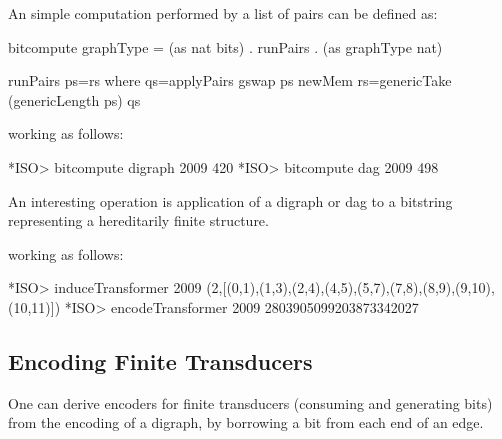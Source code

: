 \documentclass[]{INCLUDES/llncs}
\begin{document}
An simple computation performed by a list of
pairs can be defined as:
\begin{code}
bitcompute graphType =  (as nat bits) . runPairs . (as graphType nat)

runPairs ps=rs where  
  qs=applyPairs gswap ps newMem 
  rs=genericTake (genericLength ps) qs
\end{code}
working as follows:
\begin{codex}
*ISO> bitcompute digraph 2009
420
*ISO> bitcompute dag 2009
498
\end{codex}
An interesting operation is application of a digraph or dag to a
bitstring representing a hereditarily finite structure.
working as follows:
\begin{codex}
*ISO> induceTransformer 2009
(2,[(0,1),(1,3),(2,4),(4,5),(5,7),(7,8),(8,9),(9,10),(10,11)])
*ISO> encodeTransformer 2009
2803905099203873342027
\end{codex}

\begin{comment}
undoTransps (l,qs) = as nat bits (applyTransps qs bs) where
  bs=genericTake l newMem
   
applyTransps qs xs = applyPairs transp qs xs

decodeTransformer x = bs where -- as nat hff_pars bs where
  (l,t)=pepis_unpair x
  db x=2*x
  ps=as dag nat t
  l'=(db l)+(genericLength ps)+1
  bs=genericTake l' (applyTransps ps newMem)
  

ttest n = mapM_ print [(bs,ts),(bs',ts')] where
  (_,t)=induceTransps n
  bs=as hff_pars nat n
  ts=applyTransps t bs
  bs'=applyTransps t ts
  ts'=applyTransps t bs'
\end{comment}

\subsection{Encoding Finite Transducers}
One can derive encoders for finite transducers (consuming and generating
bits) from the encoding of a digraph, by borrowing a bit from each end of
an edge.
\end{document}
